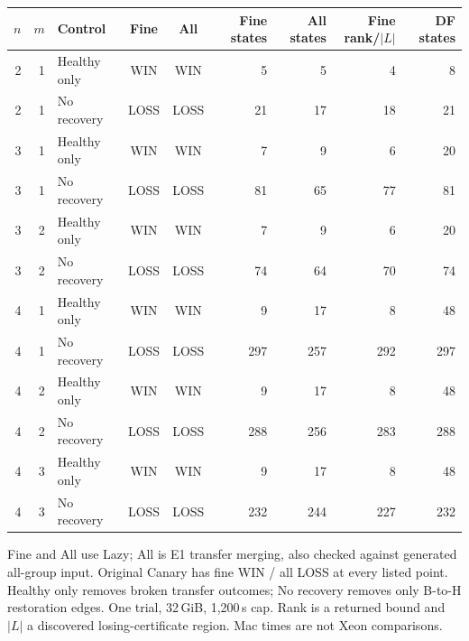 \begin{tabular}{rrlccrrrr}
\toprule
$n$ & $m$ & Control & Fine & All & Fine states & All states & Fine rank/$|L|$ & DF states \\
\midrule
2 & 1 & Healthy only & WIN & WIN & 5 & 5 & 4 & 8 \\
2 & 1 & No recovery & LOSS & LOSS & 21 & 17 & 18 & 21 \\
3 & 1 & Healthy only & WIN & WIN & 7 & 9 & 6 & 20 \\
3 & 1 & No recovery & LOSS & LOSS & 81 & 65 & 77 & 81 \\
3 & 2 & Healthy only & WIN & WIN & 7 & 9 & 6 & 20 \\
3 & 2 & No recovery & LOSS & LOSS & 74 & 64 & 70 & 74 \\
4 & 1 & Healthy only & WIN & WIN & 9 & 17 & 8 & 48 \\
4 & 1 & No recovery & LOSS & LOSS & 297 & 257 & 292 & 297 \\
4 & 2 & Healthy only & WIN & WIN & 9 & 17 & 8 & 48 \\
4 & 2 & No recovery & LOSS & LOSS & 288 & 256 & 283 & 288 \\
4 & 3 & Healthy only & WIN & WIN & 9 & 17 & 8 & 48 \\
4 & 3 & No recovery & LOSS & LOSS & 232 & 244 & 227 & 232 \\
\bottomrule
\end{tabular}
{\par\smallskip\footnotesize Fine and All use Lazy; All is E1 transfer merging, also checked against generated all-group input. Original Canary has fine WIN / all LOSS at every listed point. Healthy only removes broken transfer outcomes; No recovery removes only B-to-H restoration edges. One trial, 32\,GiB, 1,200\,s cap. Rank is a returned bound and $|L|$ a discovered losing-certificate region. Mac times are not Xeon comparisons.}
